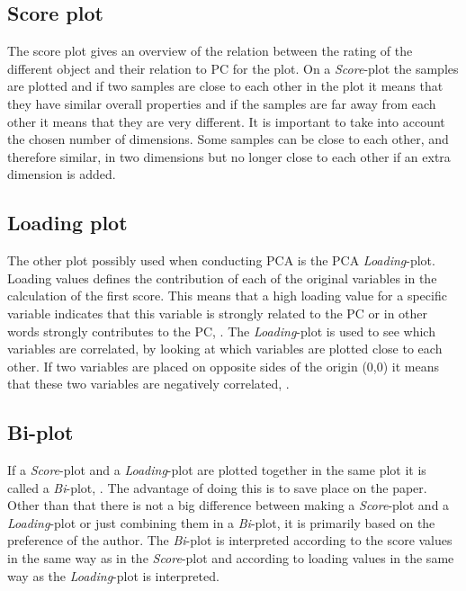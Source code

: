 \subsection*{Score plot}
The score plot gives an overview of the relation between the rating of the different object and their relation to PC for the plot. \blankline
%
%
On a \textit{Score}-plot the samples are plotted and if two samples are close to each other in the plot it means that they have similar overall properties and if the samples are far away from each other it means that they are very different. It is important to take into account the chosen number of dimensions. Some samples can be close to each other, and therefore similar, in two dimensions but no longer close to each other if an extra dimension is added. 
%
\subsection*{Loading plot}
The other plot possibly used when conducting PCA is the PCA \textit{Loading}-plot. Loading values defines the contribution of each of the original variables in the calculation of the first score. This means that a high loading value for a specific variable indicates that this variable is strongly related to the PC or in other words strongly contributes to the PC, \parencite[p. 212]{Naes2010}. \blankline
%
The \textit{Loading}-plot is used to see which variables are correlated, by looking at which variables are plotted close to each other. If two variables are placed on opposite sides of the origin (0,0) it means that these two variables are negatively correlated, \parencite[p. 216]{Naes2010}. 
%
\subsection*{Bi-plot}
If a \textit{Score}-plot and a \textit{Loading}-plot are plotted together in the same plot it is called a \textit{Bi}-plot, \parencite[p. 217]{Naes2010}. The advantage of doing this is to save place on the paper. Other than that there is not a big difference between making a \textit{Score}-plot and a \textit{Loading}-plot or just combining them in a \textit{Bi}-plot, it is primarily based on the preference of the author. The \textit{Bi}-plot is interpreted according to the score values in the same way as in the \textit{Score}-plot and according to loading values in the same way as the \textit{Loading}-plot is interpreted. 
%
